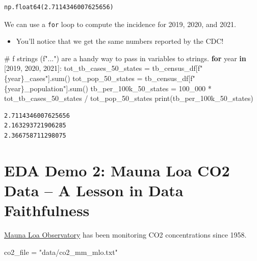 \documentclass[
  letterpaper,
  DIV=11,
  numbers=noendperiod]{scrreprt}
\newenvironment{Shaded}{\begin{snugshade}}{\end{snugshade}}
\newcommand{\BuiltInTok}[1]{\textcolor[rgb]{0.00,0.23,0.31}{#1}}
\newcommand{\CommentTok}[1]{\textcolor[rgb]{0.37,0.37,0.37}{#1}}
\newcommand{\ControlFlowTok}[1]{\textcolor[rgb]{0.00,0.23,0.31}{\textbf{#1}}}
\newcommand{\DecValTok}[1]{\textcolor[rgb]{0.68,0.00,0.00}{#1}}
\newcommand{\KeywordTok}[1]{\textcolor[rgb]{0.00,0.23,0.31}{\textbf{#1}}}
\newcommand{\NormalTok}[1]{\textcolor[rgb]{0.00,0.23,0.31}{#1}}
\newcommand{\OperatorTok}[1]{\textcolor[rgb]{0.37,0.37,0.37}{#1}}
\newcommand{\SpecialCharTok}[1]{\textcolor[rgb]{0.37,0.37,0.37}{#1}}
\newcommand{\SpecialStringTok}[1]{\textcolor[rgb]{0.13,0.47,0.30}{#1}}
\newcommand{\StringTok}[1]{\textcolor[rgb]{0.13,0.47,0.30}{#1}}
\providecommand{\tightlist}{%
  \setlength{\itemsep}{0pt}\setlength{\parskip}{0pt}}\usepackage{longtable,booktabs,array}
\begin{document}
\begin{verbatim}
np.float64(2.7114346007625656)
\end{verbatim}

We can use a \texttt{for} loop to compute the incidence for 2019, 2020,
and 2021.

\begin{itemize}
\tightlist
\item
  You'll notice that we get the same numbers reported by the CDC!
\end{itemize}

\begin{Shaded}
\begin{Highlighting}[]
\CommentTok{\# f strings (f"...") are a handy way to pass in variables to strings.}
\ControlFlowTok{for}\NormalTok{ year }\KeywordTok{in}\NormalTok{ [}\DecValTok{2019}\NormalTok{, }\DecValTok{2020}\NormalTok{, }\DecValTok{2021}\NormalTok{]:}
\NormalTok{  tot\_tb\_cases\_50\_states }\OperatorTok{=}\NormalTok{ tb\_census\_df[}\SpecialStringTok{f"}\SpecialCharTok{\{}\NormalTok{year}\SpecialCharTok{\}}\SpecialStringTok{\_cases"}\NormalTok{].}\BuiltInTok{sum}\NormalTok{()}
\NormalTok{  tot\_pop\_50\_states }\OperatorTok{=}\NormalTok{ tb\_census\_df[}\SpecialStringTok{f"}\SpecialCharTok{\{}\NormalTok{year}\SpecialCharTok{\}}\SpecialStringTok{\_population"}\NormalTok{].}\BuiltInTok{sum}\NormalTok{()}
\NormalTok{  tb\_per\_100k\_50\_states }\OperatorTok{=} \DecValTok{100\_000} \OperatorTok{*}\NormalTok{ tot\_tb\_cases\_50\_states }\OperatorTok{/}\NormalTok{ tot\_pop\_50\_states}
  \BuiltInTok{print}\NormalTok{(tb\_per\_100k\_50\_states)}
\end{Highlighting}
\end{Shaded}

\begin{verbatim}
2.7114346007625656
2.163293721906285
2.366758711298075
\end{verbatim}

\section{EDA Demo 2: Mauna Loa CO2 Data -- A Lesson in Data
Faithfulness}\label{eda-demo-2-mauna-loa-co2-data-a-lesson-in-data-faithfulness}

\href{https://gml.noaa.gov/ccgg/trends/data.html}{Mauna Loa Observatory}
has been monitoring CO2 concentrations since 1958.

\begin{Shaded}
\begin{Highlighting}[]
\NormalTok{co2\_file }\OperatorTok{=} \StringTok{"data/co2\_mm\_mlo.txt"}
\end{Highlighting}
\end{Shaded}
\end{document}
